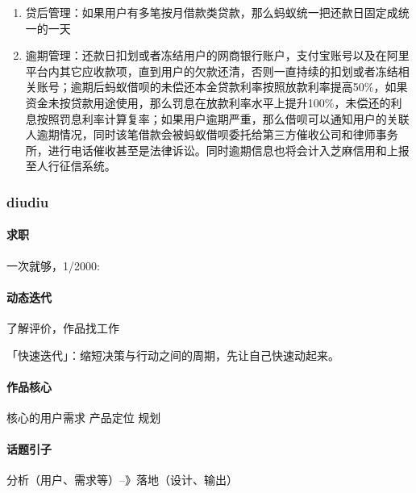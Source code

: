 \documentclass[letterpaper,11pt,english]{sphinxmanual}
\begin{document}
\begin{enumerate}
\item {} 
贷后管理：如果用户有多笔按月借款类贷款，那么蚂蚁统一把还款日固定成统一的一天

\item {} 
逾期管理：还款日扣划或者冻结用户的网商银行账户，支付宝账号以及在阿里平台内其它应收款项，直到用户的欠款还清，否则一直持续的扣划或者冻结相关账号；逾期后蚂蚁借呗的未偿还本金贷款利率按照放款利率提高50\%，如果资金未按贷款用途使用，那么罚息在放款利率水平上提升100\%，未偿还的利息按照罚息利率计算复率；如果用户逾期严重，那么借呗可以通知用户的关联人逾期情况，同时该笔借款会被蚂蚁借呗委托给第三方催收公司和律师事务所，进行电话催收甚至是法律诉讼。同时逾期信息也将会计入芝麻信用和上报至人行征信系统。

\end{enumerate}


\subsubsection{diudiu}
\label{\detokenize{chapter_experience/diudiu:diudiu}}\label{\detokenize{chapter_experience/diudiu::doc}}

\paragraph{求职}
\label{\detokenize{chapter_experience/diudiu:id1}}
一次就够，1/2000:


\paragraph{动态迭代}
\label{\detokenize{chapter_experience/diudiu:id2}}
了解评价，作品找工作

「快速迭代」：缩短决策与行动之间的周期，先让自己快速动起来。%
\begin{footnote}[619]\sphinxAtStartFootnote
{}
%
\end{footnote}


\paragraph{作品核心}
\label{\detokenize{chapter_experience/diudiu:id3}}
核心的用户需求 产品定位 规划


\paragraph{话题引子}
\label{\detokenize{chapter_experience/diudiu:id4}}
分析（用户、需求等）–》落地（设计、输出）
\end{document}
